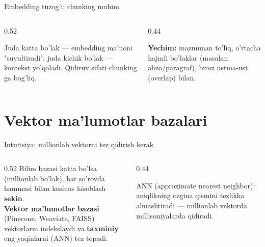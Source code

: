\documentclass[aspectratio=169,11pt]{beamer}
\begin{document}
\begin{frame}{Embedding tuzog'i: chunking muhim}
  \begin{columns}[T]
    \begin{column}{0.52\textwidth}
      \begin{tcolorbox}[warnbox,title={Noto'g'ri bo'lak hajmi}]
        \small
        Juda katta bo'lak --- embedding ma'noni "suyultiradi"; juda kichik
        bo'lak --- kontekst yo'qoladi. Qidiruv sifati chunking ga bog'liq.
      \end{tcolorbox}
    \end{column}
    \begin{column}{0.44\textwidth}
      \begin{tcolorbox}[okbox,top=2pt,bottom=2pt]
        \footnotesize
        \textbf{Yechim:} mazmunan to'liq, o'rtacha hajmli bo'laklar (masalan
        ahzo/paragraf), biroz ustma-ust (overlap) bilan.
      \end{tcolorbox}
    \end{column}
  \end{columns}
\end{frame}

\section[Vektor DB]{Vektor ma'lumotlar bazalari}

\begin{frame}{Intuitsiya: millionlab vektorni tez qidirish kerak}
  \begin{columns}[T]
    \begin{column}{0.52\textwidth}
      \small
      Bilim bazasi katta bo'lsa (millionlab bo'lak), har so'rovda hammasi bilan
      kosinus hisoblash \textbf{sekin}.\\[5pt]
      \textbf{Vektor ma'lumotlar bazasi} (Pinecone, Weaviate, FAISS) vektorlarni
      indekslaydi va \textbf{taxminiy} eng yaqinlarni (ANN) tez topadi.
    \end{column}
    \begin{column}{0.44\textwidth}
      \begin{tcolorbox}[okbox,top=2pt,bottom=2pt]
        \footnotesize
        ANN (approximate nearest neighbor): aniqlikning ozgina qismini tezlikka
        almashtiradi --- millionlab vektorda millisoniyalarda qidiradi.
      \end{tcolorbox}
    \end{column}
  \end{columns}
\end{frame}
\end{document}
